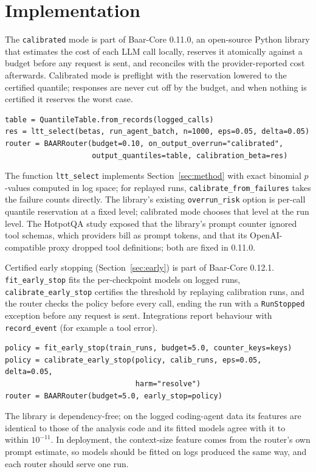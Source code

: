 \documentclass[11pt]{article}
\theoremstyle{remark}
\begin{document}
\section{Implementation}\label{sec:impl}

The \texttt{calibrated} mode is part of Baar-Core 0.11.0, an open-source Python
library that estimates the cost of each LLM call locally, reserves it
atomically against a budget before any request is sent, and reconciles with the
provider-reported cost afterwards. Calibrated mode is preflight with the
reservation lowered to the certified quantile; responses are never cut off by
the budget, and when nothing is certified it reserves the worst case.
\begin{verbatim}
table = QuantileTable.from_records(logged_calls)
res = ltt_select(betas, run_agent_batch, n=1000, eps=0.05, delta=0.05)
router = BAARRouter(budget=0.10, on_output_overrun="calibrated",
                    output_quantiles=table, calibration_beta=res)
\end{verbatim}
The function \texttt{ltt\_select} implements Section~\ref{sec:method} with
exact binomial $p$-values computed in log space; for replayed runs,
\texttt{calibrate\_from\_failures} takes the failure counts directly. The library's existing \texttt{overrun\_risk}
option is per-call quantile reservation at a fixed level; calibrated mode
chooses that level at the run level. The HotpotQA study exposed that the
library's prompt counter ignored tool schemas, which providers bill as prompt
tokens, and that its OpenAI-compatible proxy dropped tool definitions; both are
fixed in 0.11.0.

Certified early stopping (Section~\ref{sec:early}) is part of Baar-Core 0.12.1.
\texttt{fit\_early\_stop} fits the per-checkpoint models on logged runs,
\texttt{calibrate\_early\_stop} certifies the threshold by replaying
calibration runs, and the router checks the policy before every call, ending
the run with a \texttt{RunStopped} exception before any request is sent.
Integrations report behaviour with \texttt{record\_event} (for example a tool
error).
\begin{verbatim}
policy = fit_early_stop(train_runs, budget=5.0, counter_keys=keys)
policy = calibrate_early_stop(policy, calib_runs, eps=0.05, delta=0.05,
                              harm="resolve")
router = BAARRouter(budget=5.0, early_stop=policy)
\end{verbatim}
The library is dependency-free; on the logged coding-agent data its features
are identical to those of the analysis code and its fitted models agree with it
to within $10^{-11}$. In deployment, the context-size feature comes from the
router's own prompt estimate, so models should be fitted on logs produced the
same way, and each router should serve one run.
\end{document}
